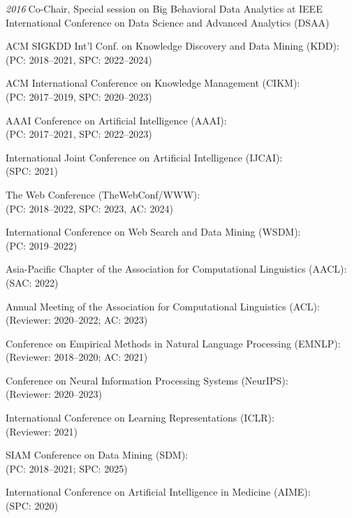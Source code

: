 \documentclass[10pt]{article}
\newenvironment{myindentpar}[1]%
{\begin{list}{}%
         {\setlength{\leftmargin}{#1}}%
         \item[]%
}
{\end{list}}
\newcounter{list}
\begin{document}
\begin{myindentpar}{0.75cm}
{\hspace{-0.75cm}\textit{2016}\textcolor{white}{.}Co-Chair, Special session on Big Behavioral Data Analytics at IEEE International Conference on Data Science and Advanced Analytics (DSAA)

}

\hspace{-0.75cm}{\bf (Senior) Program Committee / Reviewer / (Senior) Area Chair}

{\small

ACM SIGKDD Int'l Conf. on Knowledge Discovery and Data Mining (KDD): \\
(PC: 2018--2021, SPC: 2022--2024)

ACM International Conference on Knowledge Management (CIKM): \\
(PC: 2017--2019, SPC: 2020--2023)

AAAI Conference on Artificial Intelligence (AAAI): \\
(PC: 2017--2021, SPC: 2022--2023)

International Joint Conference on Artificial Intelligence (IJCAI): \\
(SPC: 2021)

The Web Conference (TheWebConf/WWW): \\
(PC: 2018--2022, SPC: 2023, AC: 2024)

International Conference on Web Search and Data Mining (WSDM): \\
(PC: 2019--2022)

Asia-Pacific Chapter of the Association for Computational Linguistics (AACL): \\
(SAC: 2022)

Annual Meeting of the Association for Computational Linguistics (ACL): \\
(Reviewer: 2020--2022; AC: 2023)

Conference on Empirical Methods in Natural Language Processing (EMNLP): \\
(Reviewer: 2018--2020; AC: 2021)

Conference on Neural Information Processing Systems (NeurIPS): \\
(Reviewer: 2020--2023)

International Conference on Learning Representations (ICLR): \\
(Reviewer: 2021)

SIAM Conference on Data Mining (SDM): \\
(PC: 2018--2021; SPC: 2025)

International Conference on Artificial Intelligence in Medicine (AIME): \\
(SPC: 2020)

}
\end{myindentpar}
\end{document}
